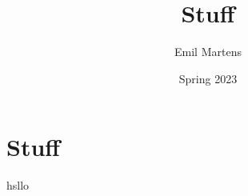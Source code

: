 \documentclass[british,titlepage,oneside]{ntnuthesis}
\title{Stuff}
\author{Emil Martens}
\date{Spring 2023}
\begin{document}
\pagebreak
\chapter{Stuff}


% 
% 
% 
% 
% 
% 

hsllo
\chapter*{\bibname}
\printbibliography[heading=none]




% 
\end{document}
